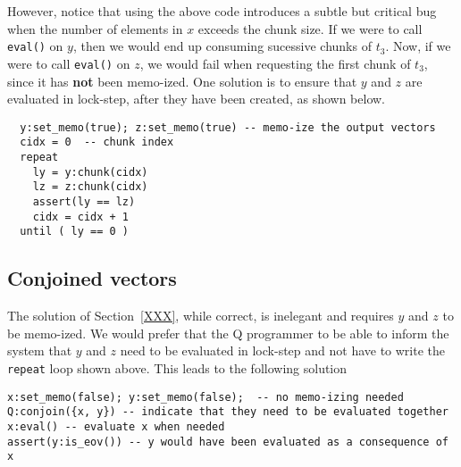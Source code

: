However, notice that using the above code introduces a subtle but
critical bug when the number of elements in \(x\) exceeds the chunk
size.  If we were to call {\tt eval()} on \(y\), then we would
end up consuming sucessive chunks of \(t_3\). Now, if we were to call
{\tt eval()} on \(z\), we would fail when requesting the first
chunk of \(t_3\), since it has {\bf not} been memo-ized. One solution
is to ensure that \(y\) and \(z\) are evaluated in lock-step, after they have
been created, as shown below.
\begin{verbatim} 
  y:set_memo(true); z:set_memo(true) -- memo-ize the output vectors
  cidx = 0  -- chunk index
  repeat 
    ly = y:chunk(cidx)
    lz = z:chunk(cidx)
    assert(ly == lz)
    cidx = cidx + 1
  until ( ly == 0 )
\end{verbatim}

\subsection{Conjoined vectors}

The solution of Section~\ref{XXX}, while correct, is inelegant and requires
\(y\) and \(z\) to be memo-ized.
We would prefer that the Q programmer to be able to
inform the system that \(y\) and \(z\) need to be evaluated in lock-step 
and not have to write the {\tt repeat} loop shown above. This leads to the
following solution

\begin{verbatim}
x:set_memo(false); y:set_memo(false);  -- no memo-izing needed
Q:conjoin({x, y}) -- indicate that they need to be evaluated together
x:eval() -- evaluate x when needed
assert(y:is_eov()) -- y would have been evaluated as a consequence of x
\end{verbatim}
